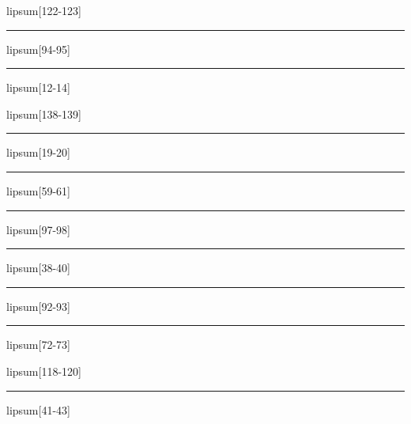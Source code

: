 \documentclass[11pt,a4paper]{article}
\begin{document}
lipsum[122-123]

\begin{simplewrap}
  \textcolor{red!21}{\rule{3.5cm}{9.4cm}}
\end{simplewrap}
lipsum[94-95]

\begin{simplewrap}
  \textcolor{olive!26}{\rule{4.0cm}{8.4cm}}
\end{simplewrap}
lipsum[12-14]

lipsum[138-139]

\begin{simplewrap}
  \textcolor{cyan!20}{\rule{5.4cm}{5.9cm}}
\end{simplewrap}
lipsum[19-20]

\begin{simplewrap}
  \textcolor{blue!47}{\rule{4.7cm}{5.4cm}}
\end{simplewrap}
lipsum[59-61]

\begin{simplewrap}
  \textcolor{brown!24}{\rule{3.3cm}{7.9cm}}
\end{simplewrap}
lipsum[97-98]

\begin{simplewrap}
  \textcolor{green!40}{\rule{4.8cm}{2.4cm}}
\end{simplewrap}
lipsum[38-40]

\begin{simplewrap}
  \textcolor{blue!21}{\rule{4.2cm}{3.1cm}}
\end{simplewrap}
lipsum[92-93]

\begin{simplewrap}
  \textcolor{yellow!31}{\rule{3.4cm}{7.5cm}}
\end{simplewrap}
lipsum[72-73]

lipsum[118-120]

\begin{simplewrap}
  \textcolor{olive!20}{\rule{5.3cm}{3.8cm}}
\end{simplewrap}
lipsum[41-43]
\end{document}
